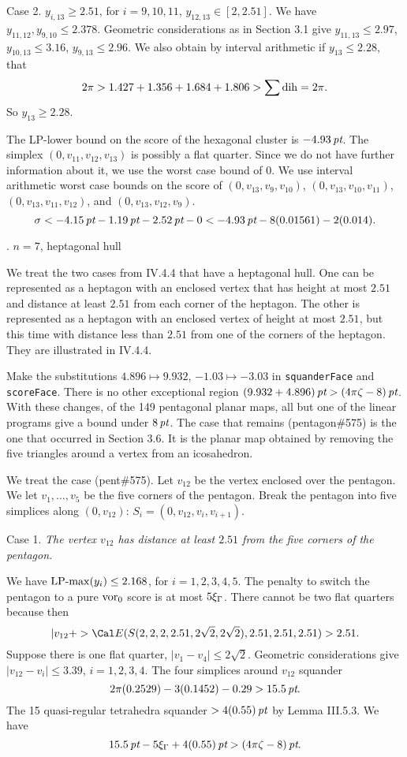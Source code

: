 Case 2.  $y_{i,13}\ge 2.51$, for $i=9,10,11$, $y_{12,13}\in[2,2.51]$.
We have $y_{11,12},y_{9,10}\le 2.378$.  Geometric considerations
as in Section 3.1 give $y_{11,13}\le 2.97$, $y_{10,13}\le 3.16$,
$y_{9,13}\le 2.96$.
We also obtain by interval arithmetic if $y_{13}\le 2.28$,
that 
$$2\pi > 1.427+1.356 + 1.684+1.806 > \sum\operatorname{dih} = 2\pi.$$
So $y_{13}\ge 2.28$.

The LP-lower bound on the score of the hexagonal cluster is
$-4.93\,\hbox{\it pt}$.  The simplex $(0,v_{11},v_{12},v_{13})$ is
possibly a flat quarter.  Since we do not have further information
about it, we use the worst case bound of 0.
We use interval arithmetic worst case bounds on the score of
$(0,v_{13},v_9,v_{10})$, $(0,v_{13},v_{10},v_{11})$, 
$(0,v_{13},v_{11},v_{12})$, and $(0,v_{13},v_{12},v_9)$.
$$\sigma<-4.15\,\hbox{\it pt}-1.19\,\hbox{\it pt}-2.52\,\hbox{\it pt}-0 < -4.93\,\hbox{\it pt}
	-8(0.01561)-2 (0.014).$$





. $n=7$, heptagonal hull\endsubhead

We treat the two cases from IV.4.4 that have a heptagonal hull.
One can be represented as a heptagon with an enclosed vertex
that has height at most $2.51$ and distance at least $2.51$ from
each corner of the heptagon.  The other is represented as a heptagon
with an enclosed vertex of height at most $2.51$, but this time
with distance less than $2.51$ from one of the corners of the
heptagon. They are illustrated in IV.4.4.

Make the substitutions $4.896\mapsto 9.932$, $-1.03\mapsto -3.03$
in {\tt squanderFace} and {\tt scoreFace}.  There is no
other exceptional region $(9.932+4.896)\,\hbox{\it pt}>(4\pi\zeta-8)\,\hbox{\it pt}$.  
With these changes, of the 149 pentagonal
planar maps, all but one of the linear programs give a bound
under $8\,\hbox{\it pt}$.  The case that remains (pentagon\#575) is the one
that occurred in Section 3.6.  It is the planar map obtained by 
removing the five triangles around a vertex
from an icosahedron.

We treat the case (pent\#575).  Let $v_{12}$ be the vertex enclosed
over the pentagon.  We let $v_1,\ldots,v_5$ be the five corners
of the pentagon.
Break the pentagon into
five simplices along $(0,v_{12})$:  $S_i = (0,v_{12},v_i,v_{i+1})$.

Case 1.  {\it The vertex $v_{12}$ has distance at least $2.51$ from
the five corners of the pentagon.}

We have $\operatorname{LP-max}(y_i)\le2.168$, for $i=1,2,3,4,5$.  The penalty
to switch the pentagon to a pure $\operatorname{vor}_0$ score is at most $5\xi_\Gamma$.
There cannot be two flat quarters because then
$$|v_{12}+>\Cal E(S(2,2,2,2.51,2\sqrt2,2\sqrt2),2.51,2.51,2.51)>2.51.$$
Suppose there is one flat quarter, $|v_1-v_4|\le2\sqrt2$.
Geometric considerations give $|v_{12}-v_i|\le3.39$, $i=1,2,3,4$.
The four simplices around $v_{12}$ squander
	$$2\pi(0.2529)-3(0.1452) - 0.29 >15.5\,\hbox{\it pt}.$$
The 15 quasi-regular tetrahedra squander $>4(0.55)\,\hbox{\it pt}$ by
Lemma III.5.3.  We have
$$15.5\,\hbox{\it pt} - 5\xi_\Gamma + 4(0.55)\,\hbox{\it pt}>(4\pi\zeta-8)\,\hbox{\it pt}.$$

